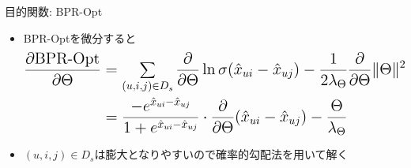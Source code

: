 \documentclass[aspectratio=43, dvipdfmx, 11pt]{beamer} %
\begin{document}
\begin{frame}{目的関数: BPR-Opt}
    
    \begin{itemize}
        \item BPR-Optを微分すると
    \begin{equation*}
        \Large{
    \begin{aligned}
        \frac{\partial \text{BPR-Opt}}{\partial \Theta} &= \sum_{(u,i,j) \in D_s} \frac{\partial}{\partial \Theta} \ln \sigma(\hat{x}_{ui}-\hat{x}_{uj})-\frac{1}{2\lambda_{\Theta}} \frac{\partial}{\partial \Theta} \|\Theta\|^2 \\
                                                 &= \frac{-e^{\hat{x}_{ui}-\hat{x}_{uj}}}{1+e^{\hat{x}_{ui}-\hat{x}_{uj}}} \cdot \frac{\partial}{\partial \Theta}(\hat{x}_{ui}-\hat{x}_{uj})-\frac{\Theta}{\lambda_{\Theta}}
    \end{aligned}
    }
\end{equation*}

   \item $(u,i,j) \in D_s$は膨大となりやすいので確率的勾配法を用いて解く
\end{itemize}
\end{frame}
\end{document}
